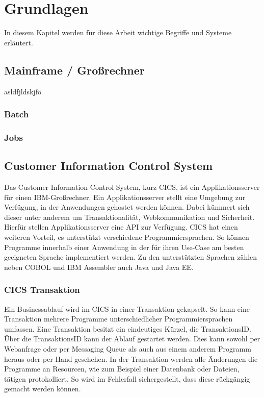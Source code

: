 \chapter{Grundlagen}\label{ch:grundlagen}
In diesem Kapitel werden für diese Arbeit wichtige Begriffe und Systeme erläutert.

\section{Mainframe / Großrechner}
asldfjldskjfö

\subsection{Batch}

\subsection{Jobs}

\section{Customer Information Control System}\label{cics}
Das Customer Information Control System, kurz CICS, ist ein Applikationsserver für einen IBM-Großrechner.
Ein Applikationsserver stellt eine Umgebung zur Verfügung, in der Anwendungen gehostet werden können.
Dabei kümmert sich dieser unter anderem um Transaktionalität, Webkommunikation und Sicherheit.
Hierfür stellen Applikationsserver eine API zur Verfügung.
CICS hat einen weiteren Vorteil, es unterstützt verschiedene Programmiersprachen.
So können Programme innerhalb einer Anwendung in der für ihren Use-Case am besten geeigneten Sprache implementiert werden.
Zu den unterstützten Sprachen zählen neben COBOL und IBM Assembler auch Java und Java EE.
\cite{Rayns.2011}

\subsection{CICS Transaktion}\label{subsec:trans}
Ein Businessablauf wird im CICS in einer Transaktion gekapselt.
So kann eine Transaktion mehrere Programme unterschiedlicher Programmiersprachen umfassen.
Eine Transaktion besitzt ein eindeutiges Kürzel, die TransaktionsID.
Über die TransaktionsID kann der Ablauf gestartet werden.
Dies kann sowohl per Webanfrage oder per Messaging Queue als auch aus einem anderem Programm heraus oder per Hand geschehen.
In der Transaktion werden alle Änderungen die Programme an Resourcen, wie zum Beispiel einer Datenbank oder Dateien, tätigen protokolliert.
So wird im Fehlerfall sichergestellt, dass diese rückgängig gemacht werden können.
 \cite{Rayns.2011}

